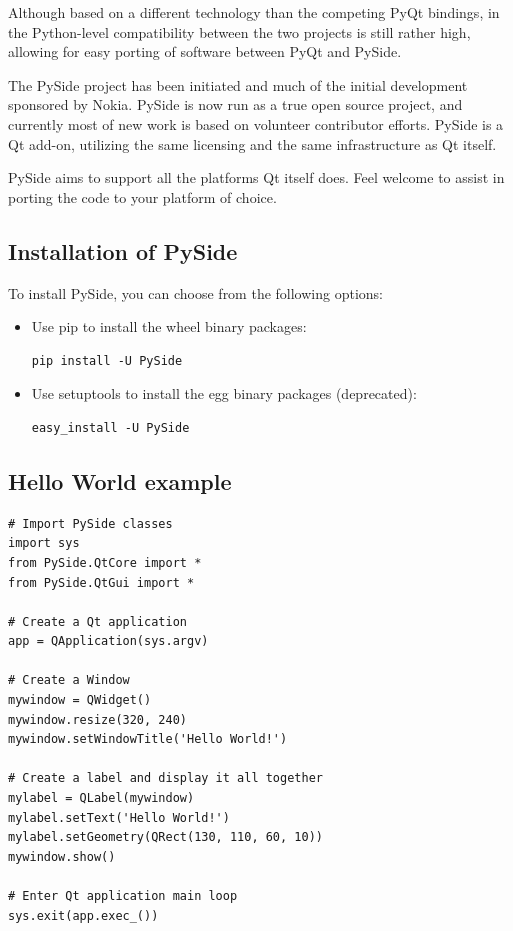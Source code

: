 Although based on a different technology than the competing PyQt bindings, in the Python-level compatibility between the two projects is still rather high, allowing for easy porting of software between PyQt and PySide.

The PySide project has been initiated and much of the initial development sponsored by Nokia. PySide is now run as a true open source project, and currently most of new work is based on volunteer contributor efforts. PySide is a Qt add-on, utilizing the same licensing and the same infrastructure as Qt itself.

PySide aims to support all the platforms Qt itself does. Feel welcome to assist in porting the code to your platform of choice.

\subsection{Installation of PySide}
To install PySide, you can choose from the following options:
\begin{itemize}
\item Use pip to install the wheel binary packages:
\begin{verbatim}
pip install -U PySide
\end{verbatim}

\item Use setuptools to install the egg binary packages (deprecated):
\begin{verbatim}
easy_install -U PySide
\end{verbatim}

\end{itemize}

\subsection{Hello World example}
\begin{verbatim}
# Import PySide classes
import sys
from PySide.QtCore import *
from PySide.QtGui import *

# Create a Qt application
app = QApplication(sys.argv)

# Create a Window
mywindow = QWidget()
mywindow.resize(320, 240)
mywindow.setWindowTitle('Hello World!')

# Create a label and display it all together
mylabel = QLabel(mywindow)
mylabel.setText('Hello World!')
mylabel.setGeometry(QRect(130, 110, 60, 10))
mywindow.show()

# Enter Qt application main loop
sys.exit(app.exec_())
\end{verbatim}


